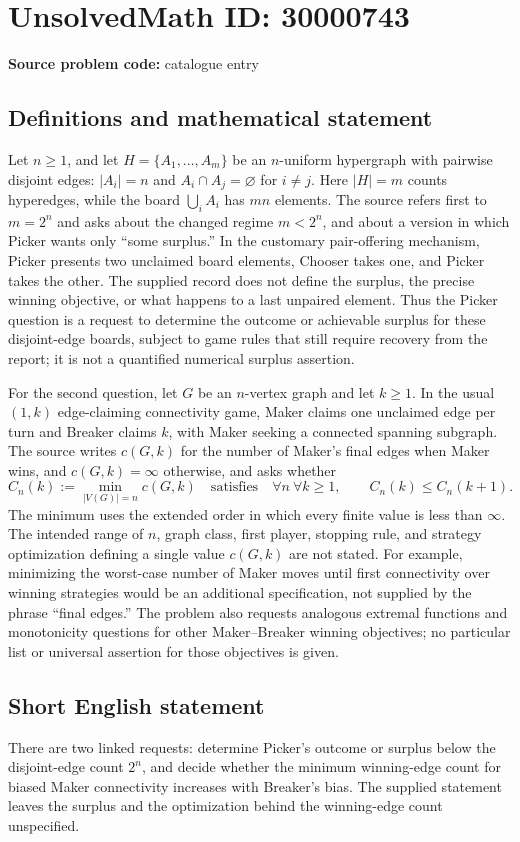 \documentclass[11pt]{article}
\begin{document}
\section*{UnsolvedMath ID: 30000743}
\textbf{Source problem code:} catalogue entry
\subsection{Definitions and mathematical statement}
Let \(n\geq1\), and let \(H=\{A_1,\ldots,A_m\}\) be an \(n\)-uniform hypergraph with pairwise disjoint edges: \(|A_i|=n\) and \(A_i\cap A_j=\varnothing\) for \(i\ne j\). Here \(|H|=m\) counts hyperedges, while the board \(\bigcup_i A_i\) has \(mn\) elements. The source refers first to \(m=2^n\) and asks about the changed regime \(m<2^n\), and about a version in which Picker wants only ``some surplus.'' In the customary pair-offering mechanism, Picker presents two unclaimed board elements, Chooser takes one, and Picker takes the other. The supplied record does not define the surplus, the precise winning objective, or what happens to a last unpaired element. Thus the Picker question is a request to determine the outcome or achievable surplus for these disjoint-edge boards, subject to game rules that still require recovery from the report; it is not a quantified numerical surplus assertion.

For the second question, let \(G\) be an \(n\)-vertex graph and let \(k\geq1\). In the usual \((1,k)\) edge-claiming connectivity game, Maker claims one unclaimed edge per turn and Breaker claims \(k\), with Maker seeking a connected spanning subgraph. The source writes \(c(G,k)\) for the number of Maker's final edges when Maker wins, and \(c(G,k)=\infty\) otherwise, and asks whether
\[
 C_n(k):=\min_{|V(G)|=n}c(G,k)
 \quad\text{satisfies}\quad
 \forall n\ \forall k\geq1,\qquad C_n(k)\leq C_n(k+1).
\]
The minimum uses the extended order in which every finite value is less than \(\infty\). The intended range of \(n\), graph class, first player, stopping rule, and strategy optimization defining a single value \(c(G,k)\) are not stated. For example, minimizing the worst-case number of Maker moves until first connectivity over winning strategies would be an additional specification, not supplied by the phrase ``final edges.'' The problem also requests analogous extremal functions and monotonicity questions for other Maker--Breaker winning objectives; no particular list or universal assertion for those objectives is given.
\subsection{Short English statement}
There are two linked requests: determine Picker's outcome or surplus below the disjoint-edge count \(2^n\), and decide whether the minimum winning-edge count for biased Maker connectivity increases with Breaker's bias. The supplied statement leaves the surplus and the optimization behind the winning-edge count unspecified.
\end{document}
